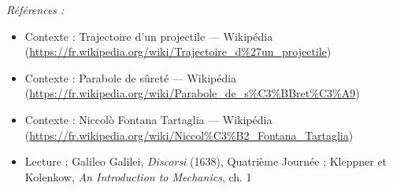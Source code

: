 \documentclass[11pt]{article}
\newenvironment{refs}{\par\small\noindent\emph{Références :}\begin{itemize}\setlength\itemsep{0pt}}{\end{itemize}\normalsize}
\begin{document}
\begin{refs}
\item Contexte : Trajectoire d'un projectile --- Wikipédia (\url{https://fr.wikipedia.org/wiki/Trajectoire_d%27un_projectile})
\item Contexte : Parabole de sûreté --- Wikipédia (\url{https://fr.wikipedia.org/wiki/Parabole_de_s%C3%BBret%C3%A9})
\item Contexte : Niccolò Fontana Tartaglia --- Wikipédia (\url{https://fr.wikipedia.org/wiki/Niccol%C3%B2_Fontana_Tartaglia})
\item Lecture : Galileo Galilei, \textit{Discorsi} (1638), Quatrième Journée ; Kleppner et Kolenkow, \textit{An Introduction to Mechanics}, ch. 1
\end{refs}

\bigskip
\end{document}
